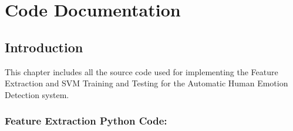 \chapter{Code Documentation} %
%


\section{Introduction} %
This chapter includes all the source code used for implementing the Feature Extraction and SVM Training and Testing for the Automatic Human Emotion Detection system.
\subsection{Feature Extraction Python Code:}

